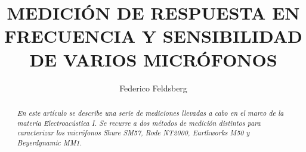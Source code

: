 \documentclass[]{article}
\title{\textbf{\LARGE{\textsf{MEDICIÓN DE RESPUESTA EN FRECUENCIA Y
 SENSIBILIDAD DE VARIOS MICRÓFONOS}}}}
\date{} %
\begin{document}


\renewcommand{\headrulewidth}{0pt} %


\author[1]{Federico Feldsberg} %


\begin{minipage}[h]{\textwidth} %
    \maketitle
    \thispagestyle{fancy}
    \fancyhf{}
    \rhead{\today}
    \cfoot{\thepage}

\end{minipage}


\begin{abstract}
\textit{En este artículo se describe una serie de mediciones llevadas a cabo
en el marco de la materia Electroacústica I. Se recurre a dos métodos
de medición distintos para caracterizar los micrófonos Shure SM57,
Rode NT2000, Earthworks M50 y Beyerdynamic MM1.}
\end{abstract}
\end{document}
